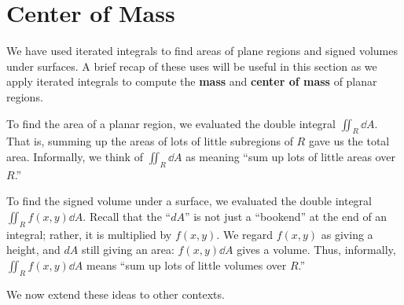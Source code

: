 \section{Center of Mass}\label{sec:center_of_mass}

We have used iterated integrals to find areas of plane regions and signed volumes under surfaces. A brief recap of these uses will be useful in this section as we apply iterated integrals to compute the \textbf{mass} and \textbf{center of mass} of planar regions.

To find the area of a planar region, we evaluated the double integral $\iint_R\dd A$. That is, summing up the areas of lots of little subregions of $R$ gave us the total area. Informally, we think of $\iint_R\dd A$ as meaning ``sum up lots of little areas over $R$.''

To find the signed volume under a surface, we evaluated the double integral $\iint_R f(x,y)\dd A$. Recall that the ``$dA$'' is not just a ``bookend'' at the end of an integral; rather, it is multiplied by $f(x,y)$. We regard $f(x,y)$ as giving a height, and $dA$ still giving an area: $f(x,y)\dd A$ gives a volume. Thus, informally, $\iint_Rf(x,y)\dd A$ means ``sum up lots of little volumes over $R$.''

We now extend these ideas to other contexts.

